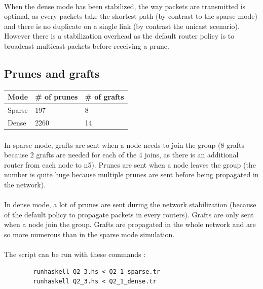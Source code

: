 \documentclass[a4paper]{article}
\begin{document}
    \paragraph{}When the dense mode has been stabilized, the way packets are
transmitted is optimal, as every packets take the shortest path (by contrast to
the sparse mode) and there is no duplicate on a single link (by contrast the
unicast scenario).
\newline However there is a stabilization overhead as the default router policy
is to broadcast multicast packets before receiving a prune.

  \subsection{Prunes and grafts}

    \begin{center}
        \begin{tabular}{|l|l|l|}
            \hline
            Mode   & \# of prunes & \# of grafts \\
            \hline
            Sparse & 197          & 8 \\
            Dense  & 2260         & 14 \\
            \hline
        \end{tabular}
    \end{center}

    \paragraph{}In sparse mode, grafts are sent when a node needs to join the
group (8 grafts because 2 grafts are needed for each of the 4 joins, as
there is an additional router from each node to n5).
\newline Prunes are sent when a node leaves the group (the number is quite huge
because multiple prunes are sent before being propagated in the network).

    \paragraph{}In dense mode, a lot of prunes are sent during the network
stabilization (because of the default policy to propagate packets in every
routers). Grafts are only sent when a node join the group. Grafts are propagated
in the whole network and are so more numerous than in the sparse mode
simulation.

    \paragraph{}The script can be run with these commands :
    \begin{verbatim}
        runhaskell Q2_3.hs < Q2_1_sparse.tr
        runhaskell Q2_3.hs < Q2_1_dense.tr
    \end{verbatim}
\end{document}
